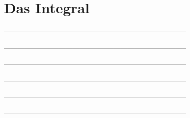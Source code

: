 \setcounter{exercise}{0}

\section{Das Integral}

--------------------------------------------------------------------------------



--------------------------------------------------------------------------------



--------------------------------------------------------------------------------



--------------------------------------------------------------------------------



--------------------------------------------------------------------------------



--------------------------------------------------------------------------------

